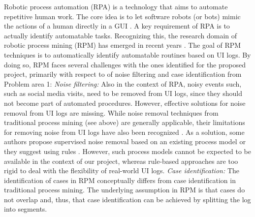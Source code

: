  

 Robotic process automation (RPA) is a technology that aims to automate repetitive human work. The core idea is to let software robots (or bots) mimic the actions of a human directly in a GUI \cite{SYED2020103162}. A key requirement of RPA is to actually identify automatable tasks.  Recognizing this, the research domain of robotic process mining (RPM) has emerged in recent years \cite{leno2021robotic}. The goal of RPM techniques is to automatically identify automatable routines based on UI logs. 
By doing so, RPM faces several challenges with the ones identified for the proposed project, primarily with respect to of noise filtering and case identification from Problem area 1:   
\vspace{0.2em}
\newline%
\noindent \textit{Noise filtering:} 
Also in the context of RPA, noisy events such, such as social media visits, need to be removed from UI logs, since they should not become part of automated procedures. However, effective solutions for noise removal from UI logs are missing. While noise removal techniques from traditional process mining (see above) are generally applicable, their limitations for removing noise from UI logs have also been recognized \cite{leno2021robotic}. 
As a solution, some authors propose supervised noise removal based on an existing process model \cite{agostinelli202111} or they suggest using rules \cite{bosco2019discovering,leno2020identifying}. However, such process models cannot be expected to be available in the context of our project, whereas rule-based approaches are too rigid to deal with the flexibility of real-world UI logs.
\vspace{0.2em}
\newline%
\noindent \textit{Case identification:} The identification of cases in RPM conceptually differs from case identification in traditional process mining. The underlying assumption in RPM is that cases do not overlap and, thus, that case identification can be achieved by splitting the log into segments. 
